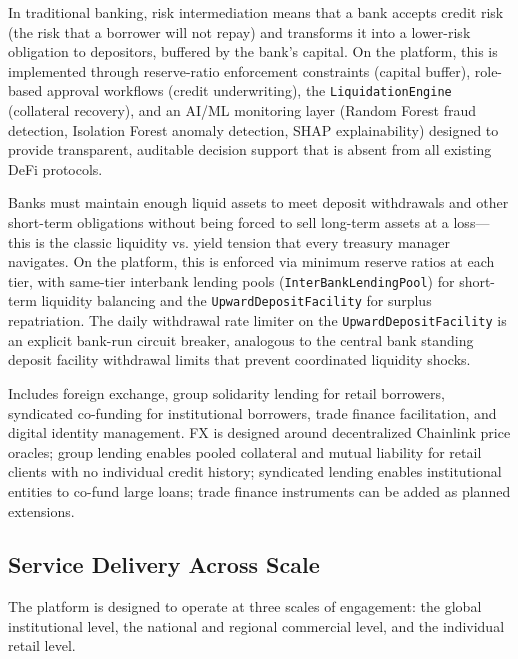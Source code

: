 \documentclass[12pt,a4paper]{report}
\begin{document}
\begin{description}[leftmargin=0pt]
\item[\textbf{Risk Intermediation.}] In traditional banking, risk intermediation means that a bank accepts credit risk (the risk that a borrower will not repay) and transforms it into a lower-risk obligation to depositors, buffered by the bank's capital. On the platform, this is implemented through reserve-ratio enforcement constraints (capital buffer), role-based approval workflows (credit underwriting), the \texttt{LiquidationEngine} (collateral recovery), and an AI/ML monitoring layer (Random Forest fraud detection, Isolation Forest anomaly detection, SHAP explainability) designed to provide transparent, auditable decision support that is absent from all existing DeFi protocols.

\item[\textbf{Liquidity Management.}] Banks must maintain enough liquid assets to meet deposit withdrawals and other short-term obligations without being forced to sell long-term assets at a loss---this is the classic liquidity vs. yield tension that every treasury manager navigates. On the platform, this is enforced via minimum reserve ratios at each tier, with same-tier interbank lending pools (\texttt{InterBankLendingPool}) for short-term liquidity balancing and the \texttt{UpwardDepositFacility} for surplus repatriation. The daily withdrawal rate limiter on the \texttt{UpwardDepositFacility} is an explicit bank-run circuit breaker, analogous to the central bank standing deposit facility withdrawal limits that prevent coordinated liquidity shocks.

\item[\textbf{Ancillary Financial Services.}] Includes foreign exchange, group solidarity lending for retail borrowers, syndicated co-funding for institutional borrowers, trade finance facilitation, and digital identity management. FX is designed around decentralized Chainlink price oracles; group lending enables pooled collateral and mutual liability for retail clients with no individual credit history; syndicated lending enables institutional entities to co-fund large loans; trade finance instruments can be added as planned extensions.
\end{description}

\subsection{Service Delivery Across Scale}

The platform is designed to operate at three scales of engagement: the global institutional level, the national and regional commercial level, and the individual retail level.
\end{document}
